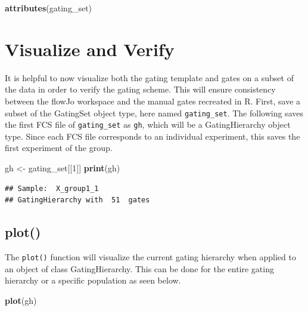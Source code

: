 \documentclass[]{book}
\newenvironment{Shaded}{\begin{snugshade}}{\end{snugshade}}
\newcommand{\DecValTok}[1]{\textcolor[rgb]{0.00,0.00,0.81}{#1}}
\newcommand{\KeywordTok}[1]{\textcolor[rgb]{0.13,0.29,0.53}{\textbf{#1}}}
\newcommand{\NormalTok}[1]{#1}
\newcommand{\StringTok}[1]{\textcolor[rgb]{0.31,0.60,0.02}{#1}}
\begin{document}
\begin{Shaded}
\begin{Highlighting}[]
\KeywordTok{attributes}\NormalTok{(gating_set)}
\end{Highlighting}
\end{Shaded}

\hypertarget{visualize-and-verify}{%
\section{Visualize and Verify}\label{visualize-and-verify}}

It is helpful to now visualize both the gating template and gates on a subset of the data in order to verify the gating scheme. This will ensure consistency between the flowJo workspace and the manual gates recreated in R. First, save a subset of the GatingSet object type, here named \texttt{gating\_set}. The following saves the first FCS file of \texttt{gating\_set} as \texttt{gh}, which will be a GatingHierarchy object type. Since each FCS file corresponds to an individual experiment, this saves the first experiment of the group.

\begin{Shaded}
\begin{Highlighting}[]
\NormalTok{gh <-}\StringTok{ }\NormalTok{gating_set[[}\DecValTok{1}\NormalTok{]]}
\KeywordTok{print}\NormalTok{(gh)}
\end{Highlighting}
\end{Shaded}

\begin{verbatim}
## Sample:  X_group1_1 
## GatingHierarchy with  51  gates
\end{verbatim}

\hypertarget{plot}{%
\subsection{plot()}\label{plot}}

The \texttt{plot()} function will visualize the current gating hierarchy when applied to an object of class GatingHierarchy. This can be done for the entire gating hierarchy or a specific population as seen below.

\begin{Shaded}
\begin{Highlighting}[]
\KeywordTok{plot}\NormalTok{(gh)}
\end{Highlighting}
\end{Shaded}
\end{document}
